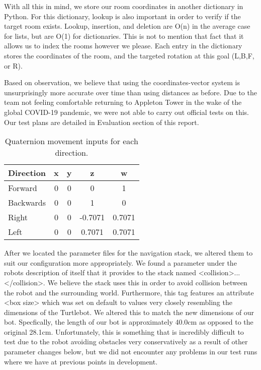 \documentclass{article}
\begin{document}
With all this in mind, we store our room coordinates in another dictionary in Python. For this dictionary, lookup is also important in order to verify if the target room exists. Lookup, insertion, and deletion are O(n) in the average case for lists, but are O(1) for dictionaries. This is not to mention that fact that it allows us to index the rooms however we please. Each entry in the dictionary stores the coordinates of the room, and the targeted rotation at this goal (L,B,F, or R).

Based on observation, we believe that using the coordinates-vector system is unsurprisingly more accurate over time than using distances as before. Due to the team not feeling comfortable returning to Appleton Tower in the wake of the global COVID-19 pandemic, we were not able to carry out official tests on this. Our test plans are detailed in Evaluation section of this report.

\begin{table}[h]
\vskip 3mm
\begin{center}
\begin{small}
\begin{sc}
\begin{tabular}{lcccc}
\hline
\abovespace\belowspace
Direction & x & y & z & w \\
\hline
  Forward & 0 & 0 & 0 & 1\\
  Backwards & 0 & 0 & 1 & 0 \\
  Right & 0 & 0 & -0.7071 & 0.7071 \\
  Left & 0 & 0 & 0.7071 & 0.7071 
\end{tabular}
\end{sc}
\end{small}
\caption{Quaternion movement inputs for each direction.}
\label{tab:quaternions}
\end{center}
\vskip -3mm
\end{table}

After we located the parameter files for the navigation stack, we altered them to suit our configuration more appropriately. We found a parameter under the robots description of itself that it provides to the stack named <collision>...</collision>. We believe the stack uses this in order to avoid collision between the robot and the surrounding world. Furthermore, this tag features an attribute <box size> which was set on default to values very closely resembling the dimensions of the Turtlebot. We altered this to match the new dimensions of our bot. Specfically, the length of our bot is approximately 40.0cm as opposed to the original 28.1cm. Unfortunately, this is something that is incredibly difficult to test due to the robot avoiding obstacles very conservatively as a result of other parameter changes below, but we did not encounter any problems in our test runs where we have at previous points in development.
\end{document}
